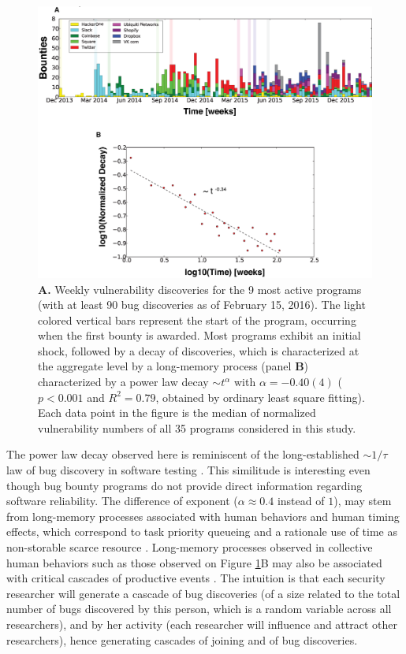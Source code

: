 \begin{figure}[h]
\begin{center}
\includegraphics[width=12cm]{../figures/timeline.eps}
\caption{\footnotesize {\bf A.} Weekly vulnerability discoveries for the 9 most active programs (with at least 90 bug discoveries as of February 15, 2016). The light colored vertical bars represent the start of the program, occurring when the first bounty is awarded. Most programs exhibit an initial shock, followed by a decay of discoveries, which is characterized at the aggregate level by a long-memory process (panel {\bf B}) characterized by a power law decay $\sim t^{\alpha}$ with $\alpha = -0.40(4)$ ($p < 0.001$ and $R^2 = 0.79$, obtained by ordinary least square fitting). Each data point in the figure is the median of normalized vulnerability numbers of all 35 programs considered in this study.}
\label{timeline}
\end{center}
\end{figure}

The power law decay observed here is reminiscent of the long-established $\sim 1/\tau$ law of bug discovery in software testing \cite{adams1984textordfeminineoptimizing}. This similitude is interesting even though bug bounty programs do not provide direct information regarding software reliability. The difference of exponent ($\alpha \approx 0.4$ instead of $1$), may stem from long-memory processes associated with human behaviors and human timing effects, which correspond to task priority queueing and a rationale use of time as non-storable scarce resource \cite{maillart2011quantification}. Long-memory processes observed in collective human behaviors such as those observed on Figure \ref{timeline}B may also be associated with critical cascades of productive events \cite{sornette2014much}. The intuition is that each security researcher will generate a cascade of bug discoveries (of a size related to the total number of bugs discovered by this person, which is a random variable across all researchers), and by her activity (each researcher will influence and attract other researchers), hence generating cascades of joining and of bug discoveries.\\

